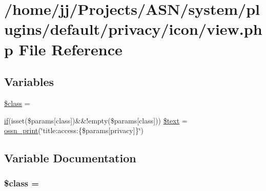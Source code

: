 \hypertarget{system_2plugins_2default_2privacy_2icon_2view_8php}{}\section{/home/jj/\+Projects/\+A\+S\+N/system/plugins/default/privacy/icon/view.php File Reference}
\label{system_2plugins_2default_2privacy_2icon_2view_8php}
\subsection*{Variables}
\begin{DoxyCompactItemize}
\item 
\hyperlink{system_2plugins_2default_2privacy_2icon_2view_8php_a252ba022809910ea710a068fc1bab657}{\$class} = \textquotesingle{}\textquotesingle{}
\item 
\hyperlink{jquery_8tokeninput_8js_ad8dd46a3cbc004569e34401e9e71771a}{if}(isset(\$params\mbox{[}\textquotesingle{}class\textquotesingle{}\mbox{]})\&\&!empty(\$params\mbox{[}\textquotesingle{}class\textquotesingle{}\mbox{]})) \hyperlink{system_2plugins_2default_2privacy_2icon_2view_8php_a7e35dafe151db63470e8b2e8bc4cbc33}{\$text} = \hyperlink{ossn_8lib_8languages_8php_a2be5d1c4b695593a9b9067b96df2150a}{ossn\+\_\+print}(\char`\"{}title\+:access\+:\{\$params\mbox{[}\textquotesingle{}privacy\textquotesingle{}\mbox{]}\}\char`\"{})
\end{DoxyCompactItemize}


\subsection{Variable Documentation}
\subsubsection[{\texorpdfstring{\$class}{$class}}]{\setlength{\rightskip}{0pt plus 5cm}\$class = \textquotesingle{}\textquotesingle{}}\hypertarget{system_2plugins_2default_2privacy_2icon_2view_8php_a252ba022809910ea710a068fc1bab657}{}\label{system_2plugins_2default_2privacy_2icon_2view_8php_a252ba022809910ea710a068fc1bab657}



